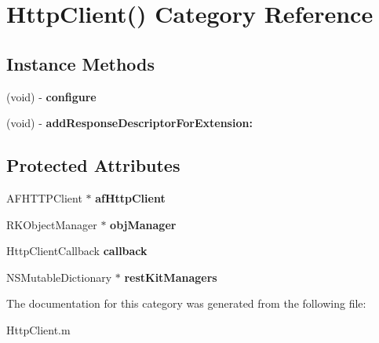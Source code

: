 \hypertarget{category_http_client_07_08}{}\section{Http\+Client() Category Reference}
\label{category_http_client_07_08}
\subsection*{Instance Methods}
\begin{DoxyCompactItemize}
\item 
(void) -\/ {\bfseries configure}\hypertarget{category_http_client_07_08_a35ccddeb3cd322550d1d3b77cf0faf5b}{}\label{category_http_client_07_08_a35ccddeb3cd322550d1d3b77cf0faf5b}

\item 
(void) -\/ {\bfseries add\+Response\+Descriptor\+For\+Extension\+:}\hypertarget{category_http_client_07_08_a46a394a0578825c2ca5466302c5740eb}{}\label{category_http_client_07_08_a46a394a0578825c2ca5466302c5740eb}

\end{DoxyCompactItemize}
\subsection*{Protected Attributes}
\begin{DoxyCompactItemize}
\item 
A\+F\+H\+T\+T\+P\+Client $\ast$ {\bfseries af\+Http\+Client}\hypertarget{category_http_client_07_08_a48da07a660acc5f2fbfdc7946195a0ee}{}\label{category_http_client_07_08_a48da07a660acc5f2fbfdc7946195a0ee}

\item 
R\+K\+Object\+Manager $\ast$ {\bfseries obj\+Manager}\hypertarget{category_http_client_07_08_a7dd797e906c530adf2c359a3ac98e8af}{}\label{category_http_client_07_08_a7dd797e906c530adf2c359a3ac98e8af}

\item 
Http\+Client\+Callback {\bfseries callback}\hypertarget{category_http_client_07_08_a7fcaf1b8677dc7f3375bb9795b92d420}{}\label{category_http_client_07_08_a7fcaf1b8677dc7f3375bb9795b92d420}

\item 
N\+S\+Mutable\+Dictionary $\ast$ {\bfseries rest\+Kit\+Managers}\hypertarget{category_http_client_07_08_a2691c5c9ce43b0309fda7b658fef48a4}{}\label{category_http_client_07_08_a2691c5c9ce43b0309fda7b658fef48a4}

\end{DoxyCompactItemize}


The documentation for this category was generated from the following file\+:\begin{DoxyCompactItemize}
\item 
Http\+Client.\+m\end{DoxyCompactItemize}
